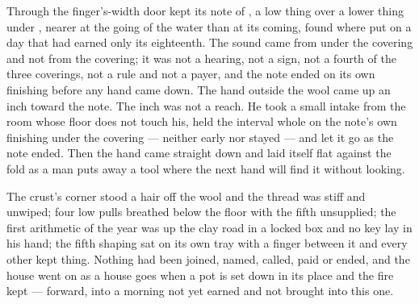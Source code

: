 Through the finger's-width door  kept its note of , a low thing over a lower thing under , nearer at the going of the water than at its coming, found where put on a day that had earned only its eighteenth. The sound came from under the covering and not from the covering; it was not a hearing, not a sign, not a fourth of the three coverings, not a rule and not a payer, and the note ended on its own finishing before any hand came down. The hand outside the wool came up an inch toward the note. The inch was not a reach. He took a small intake from the room whose floor does not touch his, held the interval whole on the note's own finishing under the covering --- neither early nor stayed --- and let it go as the note ended. Then the hand came straight down and laid itself flat against the fold as a man puts away a tool where the next hand will find it without looking.

The crust's corner stood a hair off the wool and the thread was stiff and unwiped; four low pulls breathed below the floor with the fifth unsupplied; the first arithmetic of the year was up the clay road in a locked box and no key lay in his hand; the fifth shaping sat on its own tray with a finger between it and every other kept thing. Nothing had been joined, named, called, paid or ended, and the house went on as a house goes when a pot is set down in its place and the fire kept --- forward, into a morning not yet earned and not brought into this one.
